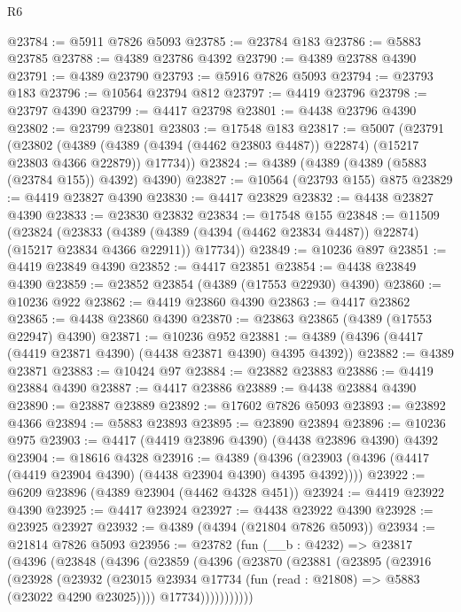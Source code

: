 \begin{lexlean}{R6}
\begin{coremodule}
@23784 := @5911 @7826 @5093
@23785 := @23784 @183
@23786 := @5883 @23785
@23788 := @4389 @23786 @4392
@23790 := @4389 @23788 @4390
@23791 := @4389 @23790
@23793 := @5916 @7826 @5093
@23794 := @23793 @183
@23796 := @10564 @23794 @812
@23797 := @4419 @23796
@23798 := @23797 @4390
@23799 := @4417 @23798
@23801 := @4438 @23796 @4390
@23802 := @23799 @23801
@23803 := @17548 @183
@23817 := @5007
    (@23791
      (@23802
        (@4389 (@4389 (@4394 (@4462 @23803 @4487)) @22874) (@15217 @23803 @4366 @22879))
        @17734))
@23824 := @4389 (@4389 (@4389 (@5883 (@23784 @155)) @4392) @4390)
@23827 := @10564 (@23793 @155) @875
@23829 := @4419 @23827 @4390
@23830 := @4417 @23829
@23832 := @4438 @23827 @4390
@23833 := @23830 @23832
@23834 := @17548 @155
@23848 := @11509
    (@23824
      (@23833
        (@4389 (@4389 (@4394 (@4462 @23834 @4487)) @22874) (@15217 @23834 @4366 @22911))
        @17734))
@23849 := @10236 @897
@23851 := @4419 @23849 @4390
@23852 := @4417 @23851
@23854 := @4438 @23849 @4390
@23859 := @23852 @23854 (@4389 (@17553 @22930) @4390)
@23860 := @10236 @922
@23862 := @4419 @23860 @4390
@23863 := @4417 @23862
@23865 := @4438 @23860 @4390
@23870 := @23863 @23865 (@4389 (@17553 @22947) @4390)
@23871 := @10236 @952
@23881 := @4389 (@4396 (@4417 (@4419 @23871 @4390) (@4438 @23871 @4390) @4395 @4392))
@23882 := @4389 @23871
@23883 := @10424 @97
@23884 := @23882 @23883
@23886 := @4419 @23884 @4390
@23887 := @4417 @23886
@23889 := @4438 @23884 @4390
@23890 := @23887 @23889
@23892 := @17602 @7826 @5093
@23893 := @23892 @4366
@23894 := @5883 @23893
@23895 := @23890 @23894
@23896 := @10236 @975
@23903 := @4417 (@4419 @23896 @4390) (@4438 @23896 @4390) @4392
@23904 := @18616 @4328
@23916 := @4389
    (@4396 (@23903 (@4396 (@4417 (@4419 @23904 @4390) (@4438 @23904 @4390) @4395 @4392))))
@23922 := @6209 @23896 (@4389 @23904 (@4462 @4328 @451))
@23924 := @4419 @23922 @4390
@23925 := @4417 @23924
@23927 := @4438 @23922 @4390
@23928 := @23925 @23927
@23932 := @4389 (@4394 (@21804 @7826 @5093))
@23934 := @21814 @7826 @5093
@23956 := @23782
    (fun (__b : @4232) =>
    @23817
      (@4396
        (@23848
          (@4396
            (@23859
              (@4396
                (@23870
                  (@23881
                    (@23895
                      (@23916
                        (@23928
                          (@23932
                            (@23015
                              @23934
                              @17734
                              (fun (read : @21808) => @5883 (@23022 @4290 @23025))))
                          @17734)))))))))))

\end{coremodule}
\end{lexlean}
